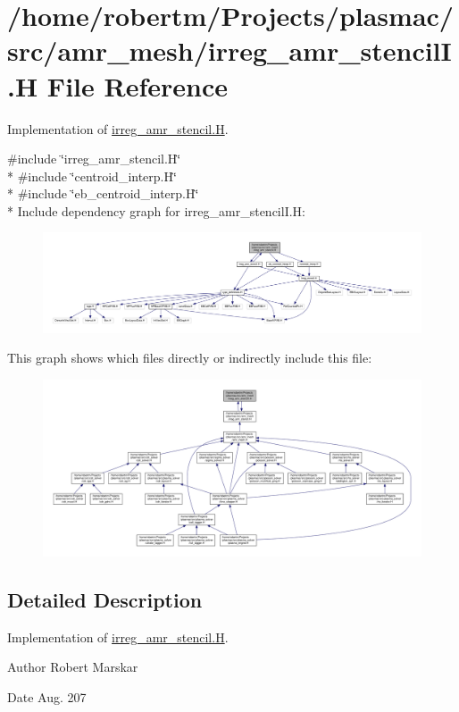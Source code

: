 \hypertarget{irreg__amr__stencilI_8H}{}\section{/home/robertm/\+Projects/plasmac/src/amr\+\_\+mesh/irreg\+\_\+amr\+\_\+stencilI.H File Reference}
\label{irreg__amr__stencilI_8H}


Implementation of \hyperlink{irreg__amr__stencil_8H}{irreg\+\_\+amr\+\_\+stencil.\+H}.  


{\ttfamily \#include \char`\"{}irreg\+\_\+amr\+\_\+stencil.\+H\char`\"{}}\\*
{\ttfamily \#include \char`\"{}centroid\+\_\+interp.\+H\char`\"{}}\\*
{\ttfamily \#include \char`\"{}eb\+\_\+centroid\+\_\+interp.\+H\char`\"{}}\\*
Include dependency graph for irreg\+\_\+amr\+\_\+stencil\+I.\+H\+:\nopagebreak
\begin{figure}[H]
\begin{center}
\leavevmode
\includegraphics[width=350pt]{irreg__amr__stencilI_8H__incl}
\end{center}
\end{figure}
This graph shows which files directly or indirectly include this file\+:\nopagebreak
\begin{figure}[H]
\begin{center}
\leavevmode
\includegraphics[width=350pt]{irreg__amr__stencilI_8H__dep__incl}
\end{center}
\end{figure}


\subsection{Detailed Description}
Implementation of \hyperlink{irreg__amr__stencil_8H}{irreg\+\_\+amr\+\_\+stencil.\+H}. 

\begin{DoxyAuthor}{Author}
Robert Marskar 
\end{DoxyAuthor}
\begin{DoxyDate}{Date}
Aug. 207 
\end{DoxyDate}

